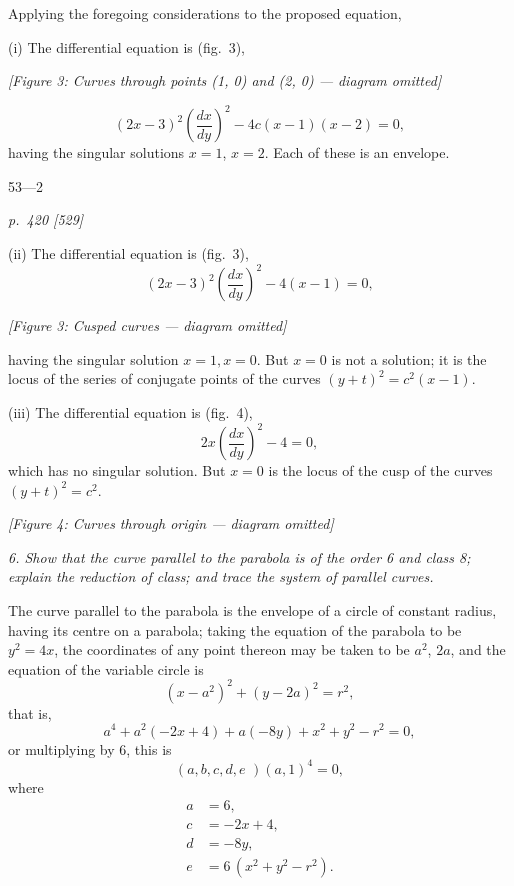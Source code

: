 \documentclass[11pt,a4paper]{article}
\theoremstyle{plain}
\theoremstyle{definition}
\begin{document}
Applying the foregoing considerations to the proposed equation,

(i) The differential equation is (fig.~3),
\begin{center}
\textit{[Figure 3: Curves through points (1, 0) and (2, 0) --- diagram omitted]}
\end{center}
\[
(2x - 3)^2 \left(\frac{dx}{dy}\right)^2 - 4c(x - 1)(x - 2) = 0,
\]
having the singular solutions $x = 1$, $x = 2$. Each of these is an envelope.

\bigskip
\hfill{\small 53---2}

\clearpage

\bigskip
\textit{p.~420 [529]}
\smallskip

(ii) The differential equation is (fig.~3),
\[
(2x - 3)^2\left(\frac{dx}{dy}\right)^2 - 4(x - 1) = 0,
\]
\begin{center}
\textit{[Figure 3: Cusped curves --- diagram omitted]}
\end{center}

\noindent
having the singular solution $x = 1, x = 0$. But $x = 0$ is not a solution; it is the locus of the series of conjugate points of the curves $(y + t)^2 = c^2(x - 1)$.

(iii) The differential equation is (fig.~4),
\[
2x\left(\frac{dx}{dy}\right)^2 - 4 = 0,
\]
which has no singular solution. But $x = 0$ is the locus of the cusp of the curves $(y + t)^2 = c^2$.

\begin{center}
\textit{[Figure 4: Curves through origin --- diagram omitted]}
\end{center}

\textit{6. Show that the curve parallel to the parabola is of the order 6 and class 8; explain the reduction of class; and trace the system of parallel curves.}

The curve parallel to the parabola is the envelope of a circle of constant radius, having its centre on a parabola; taking the equation of the parabola to be $y^2 = 4x$, the coordinates of any point thereon may be taken to be $a^2$, $2a$, and the equation of the variable circle is
\[
(x - a^2)^2 + (y - 2a)^2 = r^2,
\]
that is,
\[
a^4 + a^2(- 2x + 4) + a(- 8y) + x^2 + y^2 - r^2 = 0,
\]
or multiplying by 6, this is
\[
(a, b, c, d, e\!\!\!\!\!\,\,)(a, 1)^4 = 0,
\]
where
\begin{align*}
a &= 6,\\
c &= - 2x + 4,\\
d &= - 8y,\\
e &= 6\,(x^2 + y^2 - r^2).
\end{align*}
\end{document}

